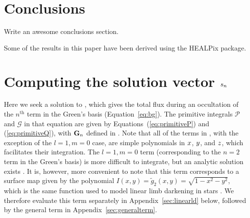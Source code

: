 \documentclass[modern]{aastex61}
\begin{document}
\section{Conclusions}
\label{sec:conclusions}

Write an awesome conclusions section.


\acknowledgments
Some of the results in this paper have been derived using the HEALPix
\citep{Gorski2005} package.

%

%


\pagebreak
\appendix
\section{Computing the solution vector $\MakeLowercase{s_n}$}
\label{sec:solutionvector}

Here we seek a solution to , which gives the total flux
during an occultation of the $n^\mathrm{th}$ term in the Green's basis
(Equation~\ref{eq:bg}). The primitive integrals $\mathcal{P}$ and
$\mathcal{G}$ in that equation are given by Equations~(\ref{eq:primitiveP})
and (\ref{eq:primitiveQ}), with
${\mathbf{G}}_n$ defined in . Note that all of the terms in ,
with the exception of the $l = 1, m = 0$ case, are simple polynomials
in $\mbox{$x$}$, $\mbox{$y$}$, and $\mbox{$z$}$, which facilitates their integration.
The $l = 1, m = 0$ term (corresponding to the $n = 2$ term in the Green's basis)
is more difficult to integrate, but an analytic
solution exists \citep{Pal2012}. It is, however, more convenient
to note that this term corresponds to a surface map given by the polynomial
$I(x, y) = \tilde{g}_2(x, y) = \sqrt{1 - x^2 - y^2}$, which is the same function used
to model linear limb darkening in stars \citep{MandelAgol2002}. We therefore
evaluate this term separately in Appendix~\ref{sec:linearld} below, followed by
the general term in Appendix~\ref{sec:generalterm}.
\end{document}
